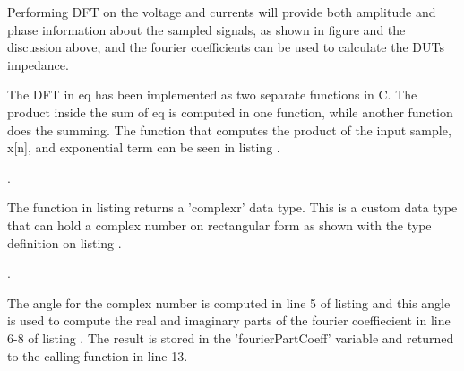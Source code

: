 Performing DFT on the voltage and currents will provide both amplitude and phase information about the sampled signals, as shown in figure  and the discussion above, and the fourier coefficients can be used to calculate the DUTs impedance.

The DFT in eq  has been implemented as two separate functions in C. The product inside the sum of eq  is computed in one function, while another function does the summing. The function that computes the product of the input sample, x[n], and exponential term can be seen in listing .

. 

The function in listing  returns a 'complexr' data type. This is a custom data type that can hold a complex number on rectangular form as shown with the type definition on listing .

. 

The angle for the complex number is computed in line 5 of listing  and this angle is used to compute the real and imaginary parts of the fourier coeffiecient in line 6-8 of listing . The result is stored in the 'fourierPartCoeff' variable and returned to the calling function in line 13.

